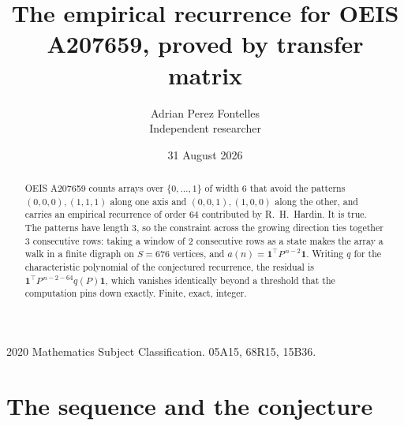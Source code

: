 \documentclass[11pt,a4paper]{article}
\title{The empirical recurrence for OEIS A207659, proved by transfer matrix}
\author{Adrian Perez Fontelles\\ \small Independent researcher}
\date{31 August 2026}
\theoremstyle{plain}
\theoremstyle{definition}
\begin{document}
\maketitle

\begin{abstract}
OEIS A207659 counts arrays over $\{0,\dots,1\}$ of width $6$ that avoid the patterns
$(0,0,0), (1,1,1)$ along one axis and $(0,0,1), (1,0,0)$ along the other, and carries an empirical recurrence of
order $64$ contributed by R.~H.~Hardin. It is true. The patterns have length $3$, so
the constraint across the growing direction ties together $3$ consecutive rows: taking a
window of $2$ consecutive rows as a state makes the array a walk in a finite digraph
on $S=676$ vertices, and $a(n)=\mathbf{1}^{\!\top}P^{\,n-2}\mathbf{1}$. Writing $q$
for the characteristic polynomial of the conjectured recurrence, the residual is
$\mathbf{1}^{\!\top}P^{\,n-2-64}q(P)\mathbf{1}$, which vanishes identically
beyond a threshold that the computation pins down exactly. Finite, exact, integer.
\end{abstract}

\noindent\small 2020 Mathematics Subject Classification. 05A15, 68R15, 15B36.\normalsize

\section{The sequence and the conjecture}
\end{document}
